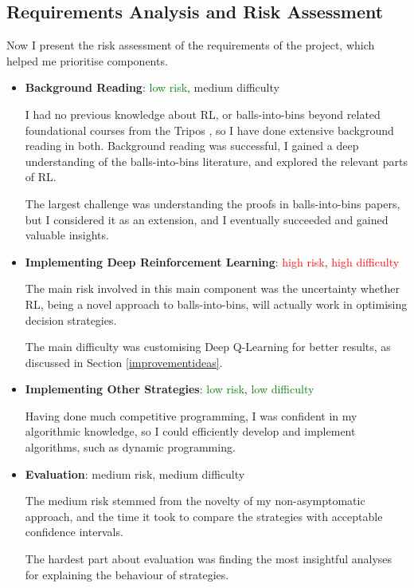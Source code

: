 \subsection{Requirements Analysis and Risk Assessment}

Now I present the risk assessment of the requirements of the project, which helped me prioritise components.

\begin{itemize}

    \item \textbf{Background Reading}: \textcolor{green}{low risk}, \textcolor{YellowOrange}{medium difficulty}
    
    I had no previous knowledge about RL, or balls-into-bins beyond related foundational courses from the Tripos , so I have done extensive background reading in both. Background reading was successful, I gained a deep understanding of the balls-into-bins literature, and explored the relevant parts of RL.
    
    The largest challenge was understanding the proofs in balls-into-bins papers, but I considered it as an extension, and I eventually succeeded and gained valuable insights.
    
    \item \textbf{Implementing Deep Reinforcement Learning}: \textcolor{red}{high risk}, \textcolor{red}{high difficulty}
    
    The main risk involved in this main component was the uncertainty whether RL, being a novel approach to balls-into-bins, will actually work in optimising decision strategies. 
    
    The main difficulty was customising Deep Q-Learning for better results, as discussed in Section \ref{improvementideas}.
    
    \item \textbf{Implementing Other Strategies}: \textcolor{green}{low risk}, \textcolor{green}{low difficulty}
    
    Having done much competitive programming, I was confident in my algorithmic knowledge, so I could efficiently develop and implement algorithms, such as dynamic programming.
    
    \item \textbf{Evaluation}: \textcolor{YellowOrange}{medium risk}, \textcolor{YellowOrange}{medium difficulty}
    
    The medium risk stemmed from the novelty of my non-asymptomatic approach, and the time it took to compare the strategies with acceptable confidence intervals.
    
    The hardest part about evaluation was finding the most insightful analyses for explaining the behaviour of strategies.
    
    
\end{itemize}
